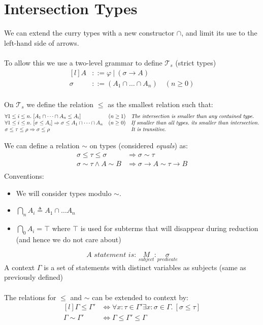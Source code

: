 \chapter{Intersection Types}
We can extend the curry types with a new constructor $\cap$, and limit its use to the left-hand side of arrows.
\\
\\ To allow this we use a two-level grammar to define $\mathcal{T}_s$ (strict types)
\[\begin{matrix*}[l]
		A & ::= \varphi \ | \ (\sigma \to A) \\
		\sigma & ::= (A_1 \cap \dots \cap A_n) \quad (n \geq 0) \\
	\end{matrix*}\]

On $\mathcal{T}_s$ we define the relation $\leq$ as the smallest relation such that:
\[\begin{matrix*}[l]
		\forall 1 \leq i \leq n . \ [A_1 \cap \dots \cap A_n \leq A_i] & (n \geq 1)  & \text{\textit{The intersection is smaller than any contained type.}}\\
		\forall 1 \leq i \leq n . \ [\sigma \leq A_i] \Rightarrow \sigma \leq A_1 \cap \dots \cap A_n & (n \geq 0) & \text{\textit{If smaller than all types, its smaller than intersection.}}\\
		\sigma \leq \tau \leq \rho \Rightarrow \sigma \leq \rho & & \text{\textit{It is transitive.}}\\
	\end{matrix*}\]

We can define a relation $\sim$ on types (considered \textit{equals}) as:
\[\begin{split}
		\sigma \leq \tau \leq \sigma &\Rightarrow \sigma \sim \tau \\
		\sigma \sim \tau \land A \sim B & \Rightarrow \sigma \to A \sim \tau \to B \\
	\end{split}\]
Conventions:
\begin{itemize}
	\item We will consider types modulo $\sim$.
	\item $\bigcap_nA_i \triangleq A_1 \cap \dots A_n$
	\item $\bigcap_0A_i = \top$ where $\top$ is used for subterms that will disappear during reduction (and hence we do not care about)
\end{itemize}

\[\textit{A statement is: } \underset{\textit{subject}}{M} : \underset{\textit{predicate}}{\sigma}\]
A context $\Gamma$ is a set of statements with distinct variables as subjects (same as previously defined)
\\
\\ The relations for $\leq$ and $\sim$ can be extended to context by:
\[\begin{matrix*}[l]
		\Gamma \leq \Gamma' & \Leftrightarrow \forall x : \tau \in \Gamma' \exists x : \sigma \in \Gamma . \ [\sigma \leq \tau] \\
		\Gamma \sim \Gamma' & \Leftrightarrow \Gamma \leq \Gamma' \leq \Gamma \\
	\end{matrix*}\]

